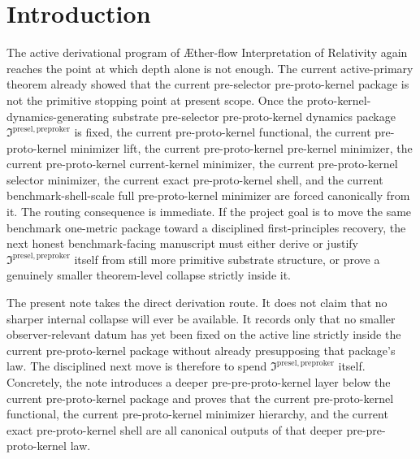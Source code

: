 \documentclass[11pt]{article}
\newcommand{\Aflow}{\AE{}ther-flow}
\newcommand{\TheoryName}{\Aflow{} Interpretation of Relativity}
\newcommand{\CompletedMetric}{g^{\sharp}}
\newcommand{\PreProtoKernelPackage}{\mathfrak I^{\mathrm{presel,preproker}}}
\begin{document}
\begin{abstract}
The benchmark boundary remains fixed throughout. The one operative metric is still exactly \(\CompletedMetric\), the ordinary matter route is unchanged, there is no second operative metric, the low-energy matter law is not enlarged, and no stronger promotion language is licensed. The positive result is therefore a genuine benchmark-facing gain below the current pre-selector pre-proto-kernel frontier: the remaining honest burden is no longer the current pre-selector pre-proto-kernel dynamics as such, but the deeper pre-selector pre-pre-proto-kernel dynamics that canonically generate them, or a still smaller collapse strictly inside that deeper package.
\end{abstract}

\section{Introduction}

The active derivational program of \TheoryName{} again reaches the point at which depth alone is not enough. The current active-primary theorem already showed that the current pre-selector pre-proto-kernel package is not the primitive stopping point at present scope. Once the proto-kernel-dynamics-generating substrate pre-selector pre-proto-kernel dynamics package \(\PreProtoKernelPackage\) is fixed, the current pre-proto-kernel functional, the current pre-proto-kernel minimizer lift, the current pre-proto-kernel pre-kernel minimizer, the current pre-proto-kernel current-kernel minimizer, the current pre-proto-kernel selector minimizer, the current exact pre-proto-kernel shell, and the current benchmark-shell-scale full pre-proto-kernel minimizer are forced canonically from it. The routing consequence is immediate. If the project goal is to move the same benchmark one-metric package toward a disciplined first-principles recovery, the next honest benchmark-facing manuscript must either derive or justify \(\PreProtoKernelPackage\) itself from still more primitive substrate structure, or prove a genuinely smaller theorem-level collapse strictly inside it.

The present note takes the direct derivation route. It does not claim that no sharper internal collapse will ever be available. It records only that no smaller observer-relevant datum has yet been fixed on the active line strictly inside the current pre-proto-kernel package without already presupposing that package's law. The disciplined next move is therefore to spend \(\PreProtoKernelPackage\) itself. Concretely, the note introduces a deeper pre-pre-proto-kernel layer below the current pre-proto-kernel package and proves that the current pre-proto-kernel functional, the current pre-proto-kernel minimizer hierarchy, and the current exact pre-proto-kernel shell are all canonical outputs of that deeper pre-pre-proto-kernel law.
\end{document}
